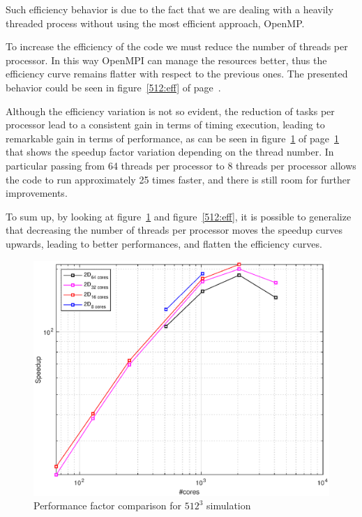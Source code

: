 Such efficiency behavior is due to the fact that we are dealing with a heavily threaded process without using the most efficient approach, OpenMP. \\
\par
To increase the efficiency of the code we must reduce the number of threads per processor. In this way OpenMPI can manage the resources better, thus the efficiency curve remains flatter with respect to the previous ones. The presented behavior could be seen in figure~\ref{512:eff} of page~\pageref{512:eff}.
\par
Although the efficiency variation is not so evident, the reduction of tasks per processor lead to a consistent gain in terms of timing execution, leading to remarkable gain in terms of performance, as can be seen in figure~\ref{512:perf} of page~\ref{512:perf} that shows the speedup factor variation depending on the thread number. In particular passing from 64 threads per processor to 8 threads per processor allows the code to run approximately 25 times faster, and there is still room for further improvements.
\par
To sum up, by looking at figure~\ref{512:perf} and figure~\ref{512:eff}, it is possible to generalize that decreasing the number of threads per processor moves the speedup curves upwards, leading to better performances, and flatten the efficiency curves.
\begin{figure}
\begin{center}
\includegraphics[scale=0.6]{grafici/5125}
\caption{Performance factor comparison for $512^3$ simulation}
\label{512:perf}
\end{center}
\end{figure}

